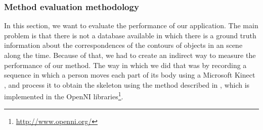\subsubsection{Method evaluation methodology}\label{ch:chapter02_02_03_01}

In this section, we want to evaluate the performance of our application. The main problem is that there is not a 
database available in which there is a ground truth information about the correspondences of the contours of objects in 
an scene along the time. Because of that, we had to create an indirect way to measure the performance of our method. The 
way in which we did that was by recording a sequence in which a person moves each part of its body using a Microsoft 
Kinect \textregistered, and process it to obtain the skeleton using the method described in \cite{shotton2013real}, 
which is implemented in the OpenNI libraries\footnote{\url{http://www.openni.org/}}.

